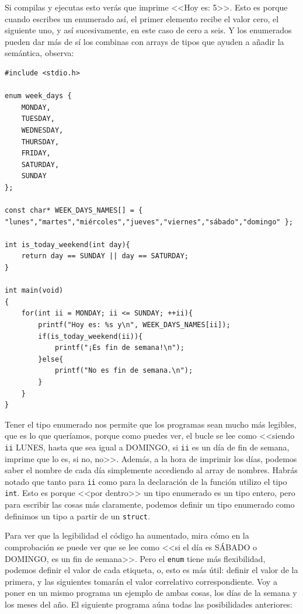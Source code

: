 \documentclass[a4paper]{article}
\begin{document}
Si compilas y ejecutas esto verás que imprime <<Hoy es: 5>>. Esto es porque
cuando escribes un enumerado así, el primer elemento recibe el valor cero, el
siguiente uno, y así sucesivamente, en este caso de cero a seis.
Y los enumerados pueden dar más de sí los combinas con arrays de tipos que
ayuden a añadir la semántica, observa:


\noindent
\begin{minipage}[H]{\linewidth}
\mbox{}
\begin{lstlisting}[style=C,
caption={Enum combinado con array de nombres},
label={lst:EnumWithNames}]
#include <stdio.h>

enum week_days {
    MONDAY,
    TUESDAY,
    WEDNESDAY,
    THURSDAY,
    FRIDAY,
    SATURDAY,
    SUNDAY
};

const char* WEEK_DAYS_NAMES[] = { "lunes","martes","miércoles","jueves","viernes","sábado","domingo" };

int is_today_weekend(int day){
    return day == SUNDAY || day == SATURDAY;
}

int main(void)
{
    for(int ii = MONDAY; ii <= SUNDAY; ++ii){
        printf("Hoy es: %s y\n", WEEK_DAYS_NAMES[ii]);
        if(is_today_weekend(ii)){
            printf("¡Es fin de semana!\n");
        }else{
            printf("No es fin de semana.\n");
        }
    }
}
\end{lstlisting}
\end{minipage}

Tener el tipo enumerado nos permite que los programas sean
mucho más legibles, que es lo que queríamos, porque como puedes ver, el bucle
se lee como <<siendo \verb!ii! LUNES, hasta que sea igual a DOMINGO, si
\verb!ii! es un día de fin de semana, imprime que lo es, si no, no>>. Además,
a la hora de imprimir los días, podemos saber el nombre de cada día simplemente
accediendo al array de nombres. Habrás notado que
tanto para \verb!ii! como para la declaración de la función utilizo el tipo
\verb!int!. Esto es porque <<por dentro>> un tipo enumerado es un tipo entero,
pero para escribir las cosas más claramente, podemos definir un tipo enumerado
como definimos un tipo a partir de un \verb!struct!.

Para ver que la legibilidad el código ha aumentado, mira cómo en la
comprobación se puede ver que se lee como <<si el día es SÁBADO o DOMINGO,
es un fin de semana>>. Pero el \verb!enum! tiene más flexibilidad, podemos
definir el valor de cada etiqueta, o, esto es más útil: definir el valor de la
primera, y las siguientes tomarán el valor correlativo correspondiente. Voy
a poner en un mismo programa un ejemplo de ambas cosas, los días de la semana
y los meses del año. El siguiente programa aúna todas las posibilidades
anteriores:
\end{document}
